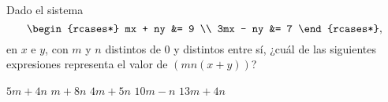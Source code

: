 \documentclass{sn-guia}
\begin{document}
\begin{problemas}
    \problema Dado el sistema 
    \begin{equation*}
        \begin{rcases*}
            mx + ny &= 9 \\
            3mx - ny &= 7
        \end{rcases*},
    \end{equation*}
    en $x$ e $y$, con $m$ y $n$ distintos de 0 y distintos entre sí, ¿cuál de las siguientes
    expresiones representa el valor de $(mn(x+y))$?
    \begin{alternativas}
        \alternativa $5m+4n$
        \alternativa $m+8n$
        \alternativa $4m+5n$
        \alternativa $10m-n$
        \alternativa $13m+4n$
    \end{alternativas}
\end{problemas}

\vspace*{\fill}
\begin{center}
\end{center}
\vspace*{\fill}
\end{document}
